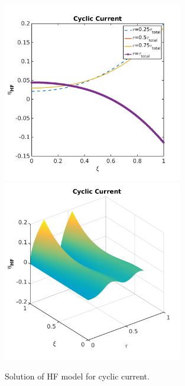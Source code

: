 \documentclass[]{article}
\begin{document}
\begin{figure}[h]
    \centering
    \includegraphics[trim = 0in 0in 0in 0in, clip, width=0.7\textwidth]{figures/etaHF2d_cycl.png}
    \\
    \includegraphics[trim = 0in 0in 0in 0in, clip, width=0.7\textwidth]{figures/etaHF3d_cycl.png}      
    \caption{Solution of HF model for cyclic current.}
    \label{fig:etaHF_cycl}
\end{figure}
\end{document}
